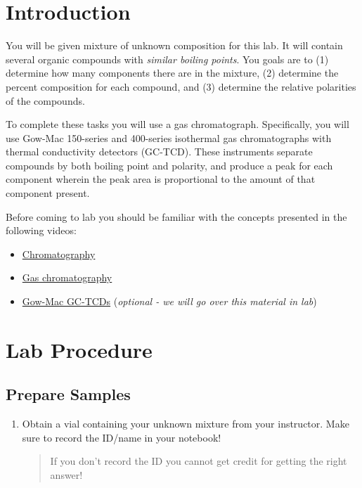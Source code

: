 \documentclass[]{tufte-book}
\providecommand{\tightlist}{%
  \setlength{\itemsep}{0pt}\setlength{\parskip}{0pt}}
\begin{document}
\hypertarget{introduction}{%
\section*{Introduction}\label{introduction}}

You will be given mixture of unknown composition for this lab. It will contain several organic compounds with \emph{similar boiling points}. You goals are to (1) determine how many components there are in the mixture, (2) determine the percent composition for each compound, and (3) determine the relative polarities of the compounds.

To complete these tasks you will use a gas chromatograph. Specifically, you will use Gow-Mac 150-series and 400-series isothermal gas chromatographs with thermal conductivity detectors (GC-TCD). These instruments separate compounds by both boiling point and polarity, and produce a peak for each component wherein the peak area is proportional to the amount of that component present.

Before coming to lab you should be familiar with the concepts presented in the following videos:

\begin{itemize}
\tightlist
\item
  \href{https://www.youtube.com/watch?v=SnbXQTTHGs4}{Chromatography}
\item
  \href{https://www.youtube.com/watch?v=4Xaa9WdXVTM}{Gas chromatography}\\
\item
  \href{https://youtu.be/0fxH9WRKigw}{Gow-Mac GC-TCDs} (\emph{optional - we will go over this material in lab})
\end{itemize}

\hypertarget{lab-procedure}{%
\section{Lab Procedure}\label{lab-procedure}}

\hypertarget{prepare-samples}{%
\subsection{Prepare Samples}\label{prepare-samples}}

\begin{enumerate}
\def\labelenumi{\arabic{enumi}.}
\item
  Obtain a vial containing your unknown mixture from your instructor. Make sure to record the ID/name in your notebook!

  \begin{quote}
  If you don't record the ID you cannot get credit for getting the right answer!
  \end{quote}
\end{enumerate}
\end{document}
